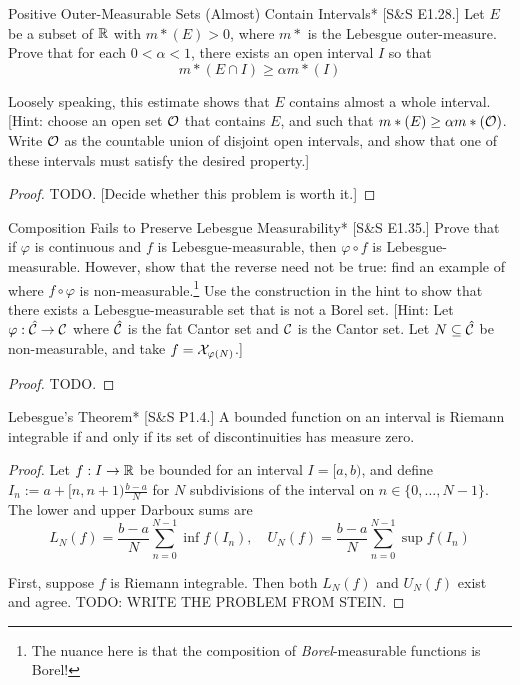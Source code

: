 \begin{problem}{Positive Outer-Measurable Sets (Almost) Contain Intervals}*
    [S\&S E1.28.] Let \(E\) be a subset of \(\mathbb{R}\) with \(m*(E) > 0\), where \(m*\) is the Lebesgue outer-measure. Prove that for each \(0 < \alpha < 1\), there exists an open interval \(I\) so that 
    \[
        m*(E \cap I) \geq \alpha m*(I)
    \]

    Loosely speaking, this estimate shows that \(E\) contains almost a whole interval. [Hint: choose an open set \(\mathcal{O}\) that contains \(E\), and such that \(m*(E) \geq \alpha m*(\mathcal{O})\). Write \(\mathcal{O}\) as the countable union of disjoint open intervals, and show that one of these intervals must satisfy the desired property.]
\end{problem}

\begin{proof}
    TODO. [Decide whether this problem is worth it.]
\end{proof}

\begin{problem}{Composition Fails to Preserve Lebesgue Measurability}*
    [S\&S E1.35.] Prove that if \(\varphi\) is continuous and \(f\) is Lebesgue-measurable, then \(\varphi \circ f\) is Lebesgue-measurable. However, show that the reverse need not be true: find an example of where \(f \circ \varphi\) is non-measurable.\footnote{The nuance here is that the composition of \textit{Borel}-measurable functions is Borel!} Use the construction in the hint to show that there exists a Lebesgue-measurable set that is not a Borel set. 
    [Hint: Let \(\varphi : \hat{\mathcal{C}} \to \mathcal{C}\) where \(\hat{\mathcal{C}}\) is the fat Cantor set and \(\mathcal{C}\) is the Cantor set. Let \(N \subseteq \hat{\mathcal{C}}\) be non-measurable, and take \(f = \mathcal{X}_{\varphi(N)}\).]
\end{problem}

\begin{proof}
    TODO. 
\end{proof}

\begin{problem}{Lebesgue's Theorem}*
    [S\&S P1.4.] A bounded function on an interval is Riemann integrable if and only if its set of discontinuities has measure zero. 
\end{problem}

\begin{proof}
    Let \(f : I \to \mathbb{R}\) be bounded for an interval \(I = [a, b)\), and define \(I_n := a + [n, n+1) \frac{b-a}{N}\) for \(N\) subdivisions of the interval on \(n \in \{0, \dots, N-1\}\). The lower and upper Darboux sums are
    \[
    L_N(f) = \frac{b-a}{N} \sum_{n=0}^{N-1} \inf f(I_n), \quad 
    U_N(f) = \frac{b-a}{N} \sum_{n=0}^{N-1} \sup f(I_n)
    \]

    First, suppose \(f\) is Riemann integrable. Then both \(L_N(f)\) and \(U_N(f)\) exist and agree. TODO: WRITE THE PROBLEM FROM STEIN. 
\end{proof}

